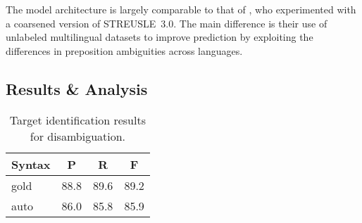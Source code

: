 \pdfoutput=1 \documentclass[11pt,a4paper]{article}
\begin{document}
The model architecture is largely comparable to that of \citet{gonen-16},
who experimented with a coarsened version of STREUSLE~3.0.
The main difference is their
use of unlabeled multilingual datasets to improve prediction by
exploiting the differences in preposition ambiguities across languages.















\subsection{Results \& Analysis}\label{sec:disambig-results}

\begin{table}[t]\centering\small
\begin{tabular}{lccc}
Syntax & P & R & F \\
\toprule
gold & 88.8 & 89.6 & 89.2 \\
auto & 86.0 & 85.8 & 85.9 \\
\end{tabular}
\caption{Target identification results for disambiguation.}
\label{tab:targetid}
\end{table}
\end{document}
